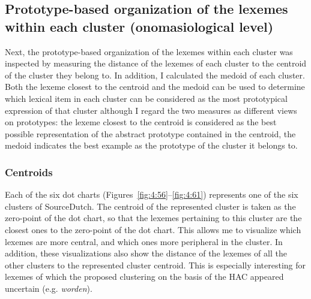 \subsection{Prototype-based organization of the lexemes within each cluster (onomasiological level)}
\label{sec:4.2.3}  
Next, the prototype-based organization of the lexemes within each cluster was inspected by measuring the distance of the lexemes of each cluster to the centroid of the cluster they belong to. In addition, I calculated the medoid of each cluster. Both the lexeme closest to the centroid and the medoid can be used to determine which lexical item in each cluster can be considered as the most prototypical expression of that cluster although I regard the two measures as different views on prototypes: the lexeme closest to the centroid is considered as the best possible representation of the abstract prototype contained in the centroid, the medoid indicates the best example as the prototype of the cluster it belongs to.

\subsubsection{Centroids}
\label{sec:4.2.3.1}  
Each of the six dot charts (Figures~\ref{fig:4:56}--\ref{fig:4:61}) represents one of the six clusters of SourceDutch. The centroid of the represented cluster is taken as the zero-point of the dot chart, so that the lexemes pertaining to this cluster are the closest ones to the zero-point of the dot chart. This allows me to visualize which lexemes are more central, and which ones more peripheral in the cluster. In addition, these visualizations also show the distance of the lexemes of all the other clusters to the represented cluster centroid. This is especially interesting for lexemes of which the proposed clustering on the basis of the HAC appeared uncertain (e.g. \textit{worden}).

